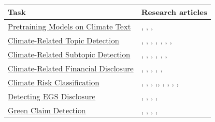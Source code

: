 \begin{table}[H]
    \centering

    \begin{tabular}{p{5cm}|p{10cm}}
    \hline
    \textbf{Task} & \textbf{Research articles} \\
    \hline
    \hyperref[sec:domain specific model]{Pretraining Models on Climate Text} &  \citet{nicolas_webersinke_climatebert_2021}, \citet{vaghefi2022deep}, \citet{thulke2024climategpt}, \citet{yu_climatebug_2024}
 \\
    \hyperref[sec:climate-related topic]{Climate-Related Topic Detection} & \citet{doran_risk_disclosure}, \citet{Engle_hedging_climatechange}, \citet{varini_climatext_2020}, \citet{nicolas_webersinke_climatebert_2021}, \citet{bingler2023cheaptalkspecificitysentiment}, \citet{yu_climatebug_2024}, \citet{linSUSTAINABLESIGNALSijcai2023}, \citet{garridomerchán2023finetuning}  \\
    \hyperref[sec:sub-topics]{Climate-Related Subtopic Detection} & \citet{hyewon_kang_analyzing_2022}, \citet{yu_climatebug_2024}, \citet{spokoyny2023answering}, \citet{Schimanski2024nature}, \citet{jain_supply_2023}, \citet{vaid-etal-2022-towards}, \citet{mishra2021neuralnere} \\
    \hyperref[sec: tcfd]{Climate-Related Financial Disclosure} &   \citet{dingCarbonEmissionsTCFD2023}, \citet{auzepy_evaluating_2023}, \citet{bjarne_brie_mandatory_2022}, \citet{bingler_cheap_2021}, \citet{sampson_tcfd-nlp_nodate}, \citet{bingler2023cheaptalkspecificitysentiment}  \\
   \hyperref[sec: climate risk]{Climate Risk Classification} &  \citet{liCorporateClimateRisk2020}, \citet{kheradmand2021a}, \citet{chou_ESG}, \citet{SAUTNER_cliamte_change_exp},\citet{marco_polignano_nlp_2022}, \citet{hyewon_kang_analyzing_2022},  \citet{kolbel_ask_2021}, \citet{Friederich_climate_risk_disclosure}, \citet{bingler2023cheaptalkspecificitysentiment}, \citet{xiang_dare_2023} \citet{nicolas_webersinke_climatebert_2021}  \\
    \hyperref[sec:esg]{Detecting EGS Disclosure} &  \citet{rouenEvolutionESGReports2023}, \citet{Mehra_2022}, \citet{schimanski_bridging_2023}, \citet{LEE2023119726}, \citet{huangFinBERTLargeLanguage2020}\\
    \hyperref[sec:green claim]{Green Claim Detection} & \citet{panchendrarajan2024claim}, \citet{vinicius_woloszyn_towards_2021}, \citet{stammbach_environmental_2023}, \citet{linSUSTAINABLESIGNALSijcai2023},  \citet{Arslan_Hassan_Li_Tremayne_2020}\\

\end{tabular}
\end{table}
